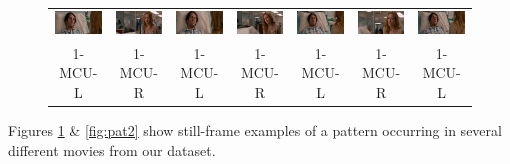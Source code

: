 \begin{figure}
\begin{center}
\begin{tabular}{c c c c c c c}
\includegraphics[width=0.11\linewidth]
  {fig/pat1/thisIs40/01.jpg}
& \includegraphics[width=0.11\linewidth]
  {fig/pat1/thisIs40/02.jpg}
& \includegraphics[width=0.11\linewidth]
  {fig/pat1/thisIs40/03.jpg}
& \includegraphics[width=0.11\linewidth]
  {fig/pat1/thisIs40/04.jpg}
& \includegraphics[width=0.11\linewidth]
  {fig/pat1/thisIs40/05.jpg}
& \includegraphics[width=0.11\linewidth]
  {fig/pat1/thisIs40/06.jpg}
& \includegraphics[width=0.11\linewidth]
  {fig/pat1/thisIs40/07.jpg}
\\
\large{1-MCU-L} & \large{1-MCU-R} 
& \large{1-MCU-L} & \large{1-MCU-R} 
& \large{1-MCU-L} & \large{1-MCU-R} 
& \large{1-MCU-L} \\

\end{tabular}
\end{center}
\label{fig:pat1}
\end{figure}

Figures \ref{fig:pat1} \& \ref{fig:pat2} show still-frame examples of a pattern occurring in several different movies from our dataset. 


